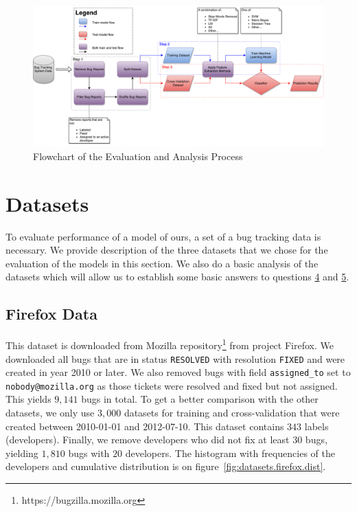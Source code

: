 \begin{landscape}
\begin{figure}[htbp]
    \centering
        \includegraphics[width=550px]{./images/flowchart/analysis_flowchart.pdf}
    \caption{Flowchart of the Evaluation and Analysis Process}
    \label{fig:model.flowchart}
\end{figure}
\end{landscape}

\section{Datasets}
\label{section:datasets}

To evaluate performance of a model of ours, a set of a bug tracking data is necessary. We provide description of the three datasets that we chose for the evaluation of the models in this section. We also do a basic analysis of the datasets which will allow us to establish some basic answers to questions \hyperlink{question:4}{4} and \hyperlink{question:5}{5}.

\subsection{Firefox Data}

This dataset is downloaded from Mozilla repository\footnote{https://bugzilla.mozilla.org} from project Firefox. We downloaded all bugs that are in status \texttt{RESOLVED} with resolution \texttt{FIXED} and were created in year 2010 or later. We also removed bugs with field \texttt{assigned\_to} set to \texttt{nobody@mozilla.org} as those tickets were resolved and fixed but not assigned. This yields $9,141$ bugs in total. To get a better comparison with the other datasets, we only use $3,000$ datasets for training and cross-validation that were created between 2010-01-01 and 2012-07-10. This dataset contains $343$ labels (developers). Finally, we remove developers who did not fix at least $30$ bugs, yielding $1,810$ bugs with $20$ developers. The histogram with frequencies of the developers and cumulative distribution is on figure~\ref{fig:datasets.firefox.dist}.


